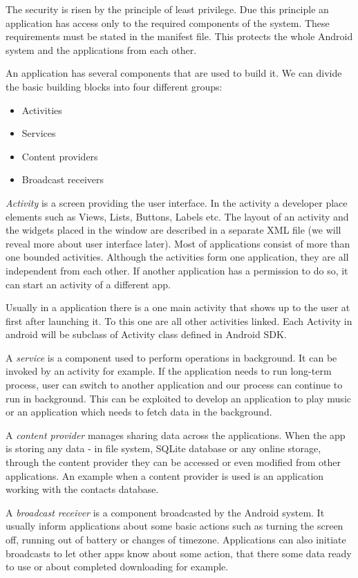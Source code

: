 The security is risen by the principle of least privilege.
Due this principle an application has access only to the required components of the system. 
These requirements must be stated in the manifest file.
This protects the whole Android system and the applications from each other.

An application has several components that are used to build it.
We can divide the basic building blocks into four different groups:
\begin{itemize}
\item{Activities}
\item{Services}
\item{Content providers}
\item{Broadcast receivers}
\end{itemize}

\emph{Activity} is a screen providing the user interface.
In the activity a developer place elements such as Views, Lists, Buttons, Labels etc. 
The layout of an activity and the widgets placed in the window are described in a separate XML file (we will reveal more about user interface later).
Most of applications consist of more than one bounded activities.
Although the activities form one application, they are all independent from each other.
If another application has a permission to do so, it can start an activity of a different app.

Usually in a application there is a one main activity that shows up to the user at first after launching it.
To this one are all other activities linked.
Each Activity in android will be subclass of Activity class defined in Android SDK.

A \emph{service} is a component used to perform operations in background.
It can be invoked by an activity for example.
If the application needs to run long-term process, user can switch to another application and our process can continue to run in background.
This can be exploited to develop an application to play music or an application which needs to fetch data in the background.

A \emph{content provider} manages sharing data across the applications.
When the app is storing any data - in file system, SQLite database or any online storage, through the content provider they can be accessed or even modified from other applications.
An example when a content provider is used is an application working with the contacts database.

A \emph{broadcast receiver} is a component broadcasted by the Android system.
It usually inform applications about some basic actions such as turning the screen off, running out of battery or changes of timezone.
Applications can also initiate broadcasts to let other apps know about some action, that there some data ready to use or about completed downloading for example.

